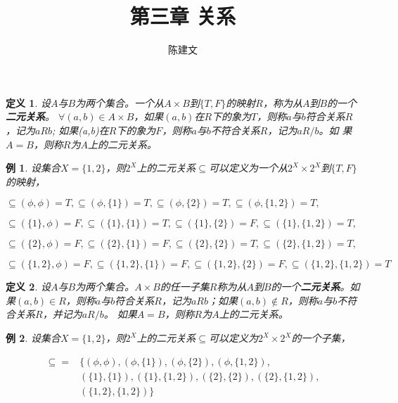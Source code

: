 \documentclass{article}
\newtheorem{Def}{定义}
\newtheorem{Example}{例}
\begin{document}
\begin{CJK*}{UTF8}{gbsn}
  \title{第三章 关系}
  \author{陈建文}
  \maketitle
  
\begin{Def}
    设$A$与$B$为两个集合。一个从$A\times B$到$\{T,F\}$的映射$R$，称为从$A$到$B$的一个{\bfseries 二元关系}。
    $\forall (a,b) \in A \times B$，如果$(a,b)$在$R$下的象为$T$，则称$a$与$b$符合关系$R$，记为$aRb$;
    如果(a,b)在$R$下的象为$F$，则称$a$与$b$不符合关系$R$，记为$aR\!\!\! / b$。如
    果$A=B$，则称$R$为$A$上的二元关系。
  \end{Def}
  \begin{Example}
  设集合$X=\{1,2\}$，则$2^X$上的二元关系$\subseteq$可以定义为一个从$2^X\times
  2^X$到$\{T,F\}$的映射，

  $\subseteq(\phi,\phi)=T,\subseteq(\phi,\{1\})=T,\subseteq(\phi,\{2\})=T,\subseteq(\phi,\{1,2\})=T,$

    $\subseteq(\{1\},\phi)=F,\subseteq(\{1\},\{1\})=T,\subseteq(\{1\},\{2\})=F,\subseteq(\{1\},\{1,2\})=T,$

      $\subseteq(\{2\},\phi)=F,\subseteq(\{2\},\{1\})=F,\subseteq(\{2\},\{2\})=T,\subseteq(\{2\},\{1,2\})=T,$

        $\subseteq(\{1,2\},\phi)=F,\subseteq(\{1,2\},\{1\})=F,\subseteq(\{1,2\},\{2\})=F,\subseteq(\{1,2\},\{1,2\})=T$
      \end{Example}

  \begin{Def}
    设$A$与$B$为两个集合。$A\times B$的任一子集$R$称为从$A$到$B$的一个{\bfseries 二元关系}。如果$(a,b)\in R$，则称$a$与$b$符合关系$R$，记为$aRb$；如果$(a,b) \notin R$，则称$a$与$b$不符合关系$R$，并记为$aR\!\!\! / b$。
    如果$A=B$，则称$R$为$A$上的二元关系。
  \end{Def}
    \begin{Example}
  设集合$X=\{1,2\}$，则$2^X$上的二元关系$\subseteq$可以定义为$2^X\times
  2^X$的一个子集，

  \begin{equation*}
    \begin{split}
 \subseteq =& \{
 (\phi,\phi),(\phi,\{1\}),(\phi,\{2\}),(\phi,\{1,2\}),\\
 &(\{1\},\{1\}),(\{1\},\{1,2\}),(\{2\},\{2\}),(\{2\},\{1,2\}),\\
 &(\{1,2\},\{1,2\})
\}
    \end{split}
  \end{equation*}
\end{Example}


\end{CJK*}
\end{document}
